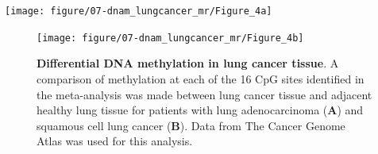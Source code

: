 \documentclass[11pt,twoside]{bristolthesis}
\begin{document}
\begin{center}\texttt{[image: figure/07-dnam\_lungcancer\_mr/Figure\_4a]} \end{center}
\begin{figure}[!hp]

{\centering \texttt{[image: figure/07-dnam\_lungcancer\_mr/Figure\_4b]} 

}

\caption[Differential DNA methylation in lung cancer tissue]{\textbf{Differential DNA methylation in lung cancer tissue}. A comparison of methylation at each of the 16 CpG sites identified in the meta-analysis was made between lung cancer tissue and adjacent healthy lung tissue for patients with lung adenocarcinoma (\textbf{A}) and squamous cell lung cancer (\textbf{B}). Data from The Cancer Genome Atlas was used for this analysis.}\label{fig:fig4-07}
\end{figure}
\pagebreak
\end{document}
